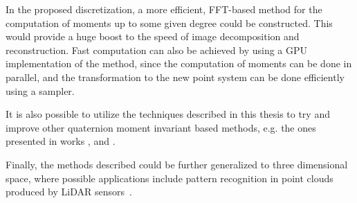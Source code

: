 In the proposed discretization, a more efficient, FFT-based method for the computation of moments up to some given degree could be constructed. This would provide a huge boost to the speed of image decomposition and reconstruction. Fast computation can also be achieved by using a GPU implementation of the method, since the computation of moments can be done in parallel, and the transformation to the new point system can be done efficiently using a sampler.

It is also possible to utilize the techniques described in this thesis to try and improve other quaternion moment invariant based methods, e.g. the ones presented in works \cite{chebyshev-fourier}, \cite{Yang,Wang,Singh} and \cite{HosnyLegendre,HosnyChebyshev,WangAcc,LiuAcc}. 

Finally, the methods described could be further generalized to three dimensional space, where possible applications include pattern recognition in point clouds produced by LiDAR sensors~\cite{zernike_lidar}.